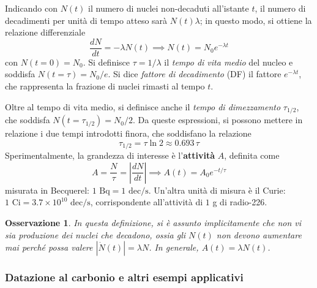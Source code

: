 \documentclass[11pt, a4paper]{scrartcl}
\theoremstyle{style}
\newtheorem{osservazione}{Osservazione}[section]
\theoremstyle{style1}
\numberwithin{equation}{subsection}
\begin{document}
Indicando con $N(t)$ il numero di nuclei non-decaduti all'istante $t$, il numero di decadimenti per unit\`a di tempo atteso sar\`a $N(t) \lambda $; in questo modo, si ottiene la relazione differenziale
\begin{equation}
	\frac{d N}{d t}  = - \lambda N (t) \implies N(t) = N_0 e^{-\lambda t}
\end{equation}
con $N(t=0) = N_0$.
Si definisce $\tau  = 1 /\lambda $ il \textit{tempo di vita medio} del nucleo e soddisfa $N(t=\tau ) = N_0 / e$.
Si dice \textit{fattore di decadimento} (DF) il fattore $e^{-\lambda t}$, che rappresenta la frazione di nuclei rimasti al tempo $t$.

Oltre al tempo di vita medio, si definisce anche il \textit{tempo di dimezzamento} $\tau _{1 / 2}$, che soddisfa $N(t = \tau _{1 / 2}) = N_0 / 2$.
Da queste espressioni, si possono mettere in relazione i due tempi introdotti finora, che soddisfano la relazione 
\begin{equation}
	\tau _{1 / 2 }= \tau  \ln 2\approx 0.693\, \tau 
\end{equation}
Sperimentalmente, la grandezza di interesse \`e l'\textbf{attivit\`a} $A$, definita come
\begin{equation}
	A  = \frac{N}{\tau }= \left\lvert \frac{d N}{d t}  \right\rvert \implies A (t) = A_0 e^{- t / \tau }
\end{equation}
misurata in Becquerel: $1\text{ Bq}= 1 \text{ dec}/\text{s}$.
Un'altra unit\`a di misura \`e il Curie: $1 \text{ Ci} = 3.7 \times 10^{10} \text{ dec}/\text{s}$, corrispondente all'attivit\`a di $1$ g di radio-226.
\begin{osservazione}
In questa definizione, si \`e assunto implicitamente che non vi sia produzione dei nuclei che decadono, ossia gli $N(t)$ non devono aumentare mai perch\'e possa valere $|\dot{N}(t) |= \lambda N$.
In generale, $A(t) = \lambda N(t)$.
\end{osservazione}
\subsubsection{Datazione al carbonio e altri esempi applicativi}
\end{document}
